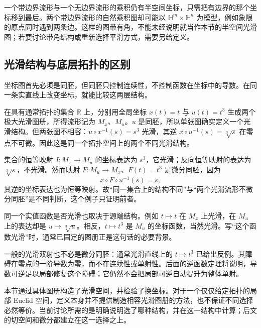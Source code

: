 \ProseParagraphBreak

一个带边界流形与一个无边界流形的乘积仍有半空间坐标，只需把有边界的那个坐标移到最后。两个带边界流形的自然乘积图却可能以 \(\mathbb H^m\times\mathbb H^n\) 为模型，例如象限的原点同时遇到两条边。这样的图带有角，不能未经说明就当作本节的半空间光滑图；若要讨论带角结构或重新选择平滑方式，需要另给定义。

\subsection{光滑结构与底层拓扑的区别}
\label{g1:subsec:1101:04}

坐标图首先必须是同胚，但同胚只控制连续性，不控制函数在坐标中的导数。在同一条实直线上改变坐标，就能比较这两层结构。

\begin{example}
	\label{g1:exm:transported-smooth-line}
	在具有通常拓扑的集合 \(\mathbb R\) 上，分别用全局坐标 \(x(t)=t\) 与 \(u(t)=t^3\) 生成两个极大光滑图册，所得流形记为 \(M_x\)、\(M_u\)。\(u\) 是同胚，所以单张图确实定义一个光滑结构。但两张图不相容：\(u\circ x^{-1}(s)=s^3\) 光滑，其逆 \(x\circ u^{-1}(s)=\sqrt[3]{s}\) 在零点不可微。因此这是同一个拓扑空间上的两个不同光滑结构。

	集合的恒等映射 \(I:M_x\to M_u\) 的坐标表达为 \(s^3\)，它光滑；反向恒等映射的表达为 \(\sqrt[3]{s}\)，不光滑。然而映射 \(F:M_u\to M_x\)、\(F(t)=t^3\) 是微分同胚，因为
	\[
		x\circ F\circ u^{-1}(s)=s,
	\]
	其逆的坐标表达也为恒等映射。故“同一集合上的结构不同”与“两个光滑流形不微分同胚”是不同判断，这个例子只证明前者。
\end{example}

同一个实值函数是否光滑也取决于源端结构。例如 \(t\mapsto t\) 在 \(M_x\) 上光滑，在 \(M_u\) 上的表达却是 \(u\mapsto\sqrt[3]{u}\)。相反，\(t\mapsto t^3\) 是 \(M_u\) 的坐标函数，当然光滑。写“这个函数光滑”时，通常已固定的图册正是这句话的必要背景。

\ProseParagraphBreak

一般的光滑双射也不必是微分同胚：通常光滑直线上的 \(t\mapsto t^3\) 已给出反例。其障碍在零点的一阶导数为零，而不在连续性或单射性。后面的逆函数定理将说明，导数可逆足以局部修复这个障碍；它仍然不会把局部可逆自动提升为整体单射。

\ProseParagraphBreak

本节通过具体图册构造了光滑空间，并检验了换坐标。对于一个仅仅给定拓扑的局部 Euclid 空间，定义本身并不提供制造相容光滑图册的方法，也不保证不同选择必然等价。当前讨论所需的是明确说明选了哪种结构，并在这一结构中计算；后文的切空间和微分都建立在这一选择之上。
